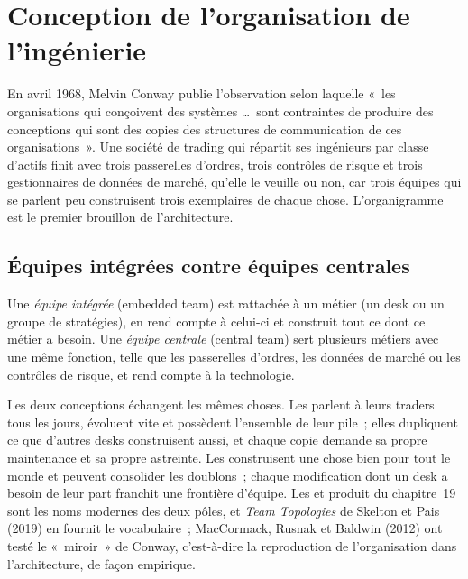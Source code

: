 \chapter{Conception de l'organisation de l'ingénierie}\label{ch:fm:engineering-organisation-design}

En avril 1968, Melvin Conway publie l'observation selon laquelle «~les organisations qui conçoivent des systèmes \dots\ sont contraintes de produire des conceptions qui sont
des copies des structures de communication de ces organisations~». Une société de trading qui répartit ses ingénieurs par classe d'actifs finit avec trois
passerelles d'ordres, trois contrôles de risque et trois gestionnaires de données de marché, qu'elle le veuille ou non, car trois équipes qui se parlent peu construisent trois
exemplaires de chaque chose. L'organigramme est le premier brouillon de l'architecture.

\section{Équipes intégrées contre équipes centrales}

\begin{definition}\label{def:fm:engineering-organisation-design:teams}
Une \emph{équipe intégrée} (embedded team) est rattachée à un métier (un desk ou un groupe de stratégies), en rend compte à celui-ci et construit tout
ce dont ce métier a besoin. Une \emph{équipe centrale} (central team) sert plusieurs métiers avec une même fonction, telle que les passerelles d'ordres, les données de marché ou les contrôles de risque, et
rend compte à la technologie.
\end{definition}

Les deux conceptions échangent les mêmes choses. Les  parlent à leurs traders tous les jours, évoluent vite et possèdent l'ensemble de leur pile~; elles dupliquent
ce que d'autres desks construisent aussi, et chaque copie demande sa propre maintenance et sa propre astreinte. Les  construisent une chose bien pour tout le monde et peuvent
consolider les doublons~; chaque modification dont un desk a besoin de leur part franchit une frontière d'équipe. Les  et produit du chapitre~19 sont les noms modernes des
deux pôles, et \emph{Team Topologies} de Skelton et Pais (2019) en fournit le vocabulaire~; MacCormack, Rusnak et Baldwin (2012) ont testé le
«~miroir~» de Conway, c'est-à-dire la reproduction de l'organisation dans l'architecture, de façon empirique.

